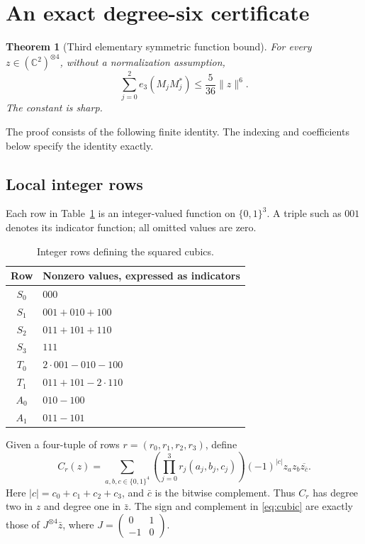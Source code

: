 \documentclass[11pt]{article}
\newtheorem{theorem}{Theorem}[section]
\theoremstyle{definition}
\theoremstyle{remark}
\newcommand{\C}{\mathbb C}
\newcommand{\conj}[1]{\overline{#1}}
\begin{document}
\section{An exact degree-six certificate}
\label{sec:sos}

\begin{theorem}[Third elementary symmetric function bound]
\label{thm:e3}
For every $z\in(\C^2)^{\otimes4}$, without a normalization assumption,
\begin{equation}
 \sum_{j=0}^2 e_3(M_jM_j^*)\leq\frac5{36}\|z\|^6.
 \label{eq:e3}
\end{equation}
The constant is sharp.
\end{theorem}

The proof consists of the following finite identity. The indexing and coefficients below specify the identity exactly.

\subsection{Local integer rows}

Each row in Table~\ref{tab:rows} is an integer-valued function on
$\{0,1\}^3$. A triple such as $001$ denotes its indicator function;
all omitted values are zero.

\begin{table}[ht]
\centering
\begin{tabular}{@{}cl@{}}
\toprule
Row & Nonzero values, expressed as indicators\\
\midrule
$S_0$ & $000$\\
$S_1$ & $001+010+100$\\
$S_2$ & $011+101+110$\\
$S_3$ & $111$\\
$T_0$ & $2\cdot001-010-100$\\
$T_1$ & $011+101-2\cdot110$\\
$A_0$ & $010-100$\\
$A_1$ & $011-101$\\
\bottomrule
\end{tabular}
\caption{Integer rows defining the squared cubics.}
\label{tab:rows}
\end{table}

Given a four-tuple of rows $r=(r_0,r_1,r_2,r_3)$, define
\begin{equation}
 C_r(z)=\sum_{a,b,c\in\{0,1\}^4}
       \left(\prod_{j=0}^3 r_j(a_j,b_j,c_j)\right)
       (-1)^{|c|}z_a z_b\conj{z_{\bar c}}.
 \label{eq:cubic}
\end{equation}
Here $|c|=c_0+c_1+c_2+c_3$, and $\bar c$ is the bitwise complement.
Thus $C_r$ has degree two in $z$ and degree one in $\bar z$.
The sign and complement in \eqref{eq:cubic} are exactly those of
$J^{\otimes4}\bar z$, where
$J=\left(\begin{smallmatrix}0&1\\-1&0\end{smallmatrix}\right)$.
\end{document}
